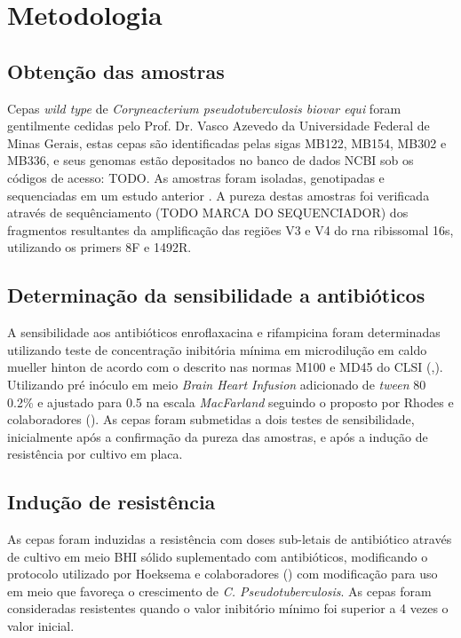 \section{Metodologia}

\subsection{Obtenção das amostras}

Cepas \textit{wild type} de \textit{Coryneacterium pseudotuberculosis biovar equi} foram gentilmente cedidas pelo Prof. Dr. Vasco Azevedo 
da Universidade Federal de Minas Gerais, estas cepas são identificadas pelas sigas MB122, MB154, MB302 e MB336, e seus genomas estão
depositados no banco de dados NCBI sob os códigos de acesso: TODO. As amostras foram isoladas, genotipadas e sequenciadas em um estudo anterior \cite{barauna2017}.
A pureza destas amostras foi verificada através de sequênciamento (TODO MARCA DO SEQUENCIADOR) dos fragmentos resultantes da 
amplificação das regiões V3 e V4 do rna ribissomal 16s, utilizando os primers 8F e 1492R.



\subsection{Determinação da sensibilidade a antibióticos}

A sensibilidade aos antibióticos enroflaxacina e rifampicina foram determinadas utilizando teste de concentração inibitória mínima em microdilução em 
caldo mueller hinton de acordo com o descrito nas
normas M100 e MD45 do CLSI (\citeyear{clsi2015},\citeyear{clsi2020}). Utilizando pré inóculo em meio \textit{Brain Heart Infusion} adicionado de \textit{tween} 80 0.2\%
e ajustado para 0.5 na escala \textit{MacFarland} seguindo o proposto por Rhodes e colaboradores (\citeyear{rhodes2015}).
As cepas foram submetidas a dois testes de sensibilidade, inicialmente após a confirmação da pureza das amostras, e após a indução de resistência por cultivo em placa.


\subsection{Indução de resistência}

As cepas foram induzidas a resistência com doses sub-letais de antibiótico através de cultivo em meio BHI sólido suplementado com antibióticos,
modificando o protocolo utilizado por Hoeksema e colaboradores (\citeyear{hoeksema2019}) com modificação para uso em meio que favoreça o crescimento de \textit{C. Pseudotuberculosis}. 
As cepas foram consideradas resistentes quando o valor inibitório mínimo foi superior a 4 vezes o valor inicial.


